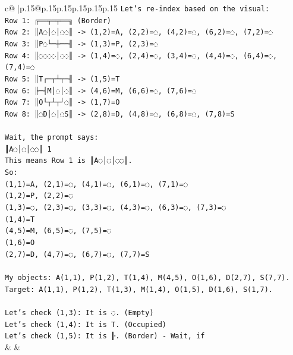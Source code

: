 \documentclass{article}
\begin{document}
{\begin{supertabular}{c@{$\;$}|p{.15\linewidth}@{}p{.15\linewidth}p{.15\linewidth}p{.15\linewidth}p{.15\linewidth}p{.15\linewidth}}
{{{\texttt{Let's re{-}index based on the visual:} \\
\texttt{Row 1: ╔══╤═╤══╗ (Border)} \\
\texttt{Row 2: ║A◌│◌│◌◌║ {-}> (1,2)=A, (2,2)=◌, (4,2)=◌, (6,2)=◌, (7,2)=◌} \\
\texttt{Row 3: ║P◌└─┼──╢ {-}> (1,3)=P, (2,3)=◌} \\
\texttt{Row 4: ║◌◌◌◌│◌◌║ {-}> (1,4)=◌, (2,4)=◌, (3,4)=◌, (4,4)=◌, (6,4)=◌, (7,4)=◌} \\
\texttt{Row 5: ║T┌─┬┴┬─╢ {-}> (1,5)=T} \\
\texttt{Row 6: ╟─┤M│◌│◌║ {-}> (4,6)=M, (6,6)=◌, (7,6)=◌} \\
\texttt{Row 7: ║O└┬┴┬┘◌║ {-}> (1,7)=O} \\
\texttt{Row 8: ║◌D│◌│◌S║ {-}> (2,8)=D, (4,8)=◌, (6,8)=◌, (7,8)=S} \\
\\ 
\texttt{Wait, the prompt says:} \\
\texttt{║A◌│◌│◌◌║ 1} \\
\texttt{This means Row 1 is ║A◌│◌│◌◌║.} \\
\texttt{So:} \\
\texttt{(1,1)=A, (2,1)=◌, (4,1)=◌, (6,1)=◌, (7,1)=◌} \\
\texttt{(1,2)=P, (2,2)=◌} \\
\texttt{(1,3)=◌, (2,3)=◌, (3,3)=◌, (4,3)=◌, (6,3)=◌, (7,3)=◌} \\
\texttt{(1,4)=T} \\
\texttt{(4,5)=M, (6,5)=◌, (7,5)=◌} \\
\texttt{(1,6)=O} \\
\texttt{(2,7)=D, (4,7)=◌, (6,7)=◌, (7,7)=S} \\
\\ 
\texttt{My objects: A(1,1), P(1,2), T(1,4), M(4,5), O(1,6), D(2,7), S(7,7).} \\
\texttt{Target: A(1,1), P(1,2), T(1,3), M(1,4), O(1,5), D(1,6), S(1,7).} \\
\\ 
\texttt{Let's check (1,3): It is ◌. (Empty)} \\
\texttt{Let's check (1,4): It is T. (Occupied)} \\
\texttt{Let's check (1,5): It is ╟. (Border) {-} Wait, if} \\
            }
        }
    }
    & & \\ \\


\end{supertabular}}
\end{document}
